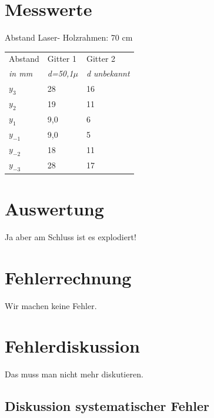 \documentclass[12pt,a4paper,titlepage,headinclude,bibtotoc]{scrartcl}
\begin{document}
\section{Messwerte}


Abstand Laser- Holzrahmen: 70 cm


\begin{table} [h]
\centering
\begin{large}

\end{large}
\begin{tabular}{|p{4 cm}||p{4 cm}|p{4 cm}|}
        \hline
          Abstand  & Gitter 1  & Gitter 2 \\
          \textit{in mm} & \textit{d=50,1$\mu$} & \textit{d unbekannt}\\
         
         
         \hline 
         $y_3 $& 28 & 16 \\
         \hline
         $y_2 $& 19 & 11\\
         \hline
         $y_{1} $& 9,0 & 6 \\
         \hline
         $y_{-1}$& 9,0 & 5 \\
         \hline
         $y_{-2}$& 18 & 11 \\
         \hline             
         $y_{-3}$& 28 & 17 \\
         \hline
\end{tabular}
\end{table}



\section{Auswertung}

Ja aber am Schluss ist es explodiert!

\section{Fehlerrechnung}
Wir machen keine Fehler.


\section{Fehlerdiskussion}
Das muss man nicht mehr diskutieren.

\subsection{Diskussion systematischer Fehler}
\end{document}
